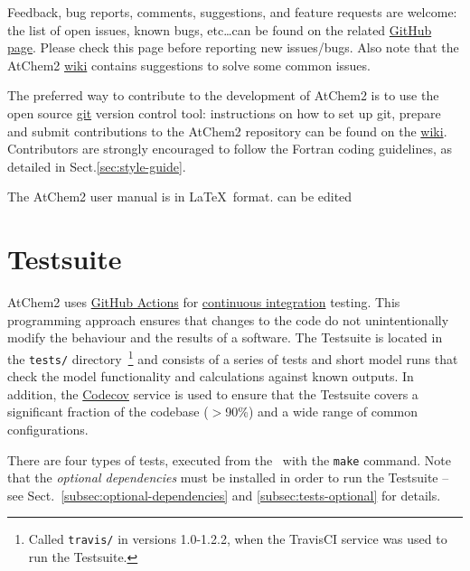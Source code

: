 Feedback, bug reports, comments, suggestions, and feature requests are
welcome: the list of open issues, known bugs, etc\ldots can be found on
the related \href{https://github.com/AtChem/AtChem2/issues}{GitHub page}.
Please check this page before reporting new issues/bugs. Also note
that the AtChem2 \href{https://github.com/AtChem/AtChem2/wiki}{wiki}
contains suggestions to solve some common issues.

The preferred way to contribute to the development of AtChem2 is to
use the open source \href{https://git-scm.com}{git} version control
tool: instructions on how to set up git, prepare and submit
contributions to the AtChem2 repository can be found on the
\href{https://github.com/AtChem/AtChem2/wiki/How-to-contribute}{wiki}.
Contributors are strongly encouraged to follow the Fortran coding
guidelines, as detailed in Sect.\ref{sec:style-guide}.

The AtChem2 user manual is in \LaTeX\ format. can be edited 

\section{Testsuite} \label{sec:test-suite}

AtChem2 uses \href{https://github.com/features/actions}{GitHub
  Actions} for \underline{continuous integration} testing. This
programming approach ensures that changes to the code do not
unintentionally modify the behaviour and the results of a
software. The Testsuite is located in the \texttt{tests/}
directory~\footnote{Called \texttt{travis/} in versions 1.0-1.2.2,
  when the TravisCI service was used to run the Testsuite.}  and
consists of a series of tests and short model runs that check the
model functionality and calculations against known outputs. In
addition, the \href{https://codecov.io}{Codecov} service is used to
ensure that the Testsuite covers a significant fraction of the
codebase ($>$90\%) and a wide range of common configurations.

There are four types of tests, executed from the \maindir\ with
the \verb|make| command. Note that the \emph{optional dependencies}
must be installed in order to run the Testsuite -- see
Sect.~\ref{subsec:optional-dependencies} and \ref{subsec:tests-optional}
for details.

